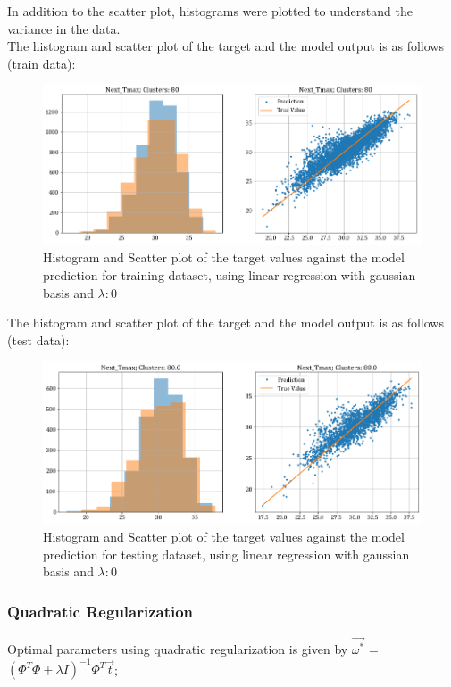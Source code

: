 \documentclass[12pt,a4paper]{article}
\newcommand{\noi}{\noindent}
\begin{document}
\noi
In addition to the scatter plot, histograms were plotted to understand the variance in the data.\\

\noi
The histogram and scatter plot of the target and the model output is as follows (train data):
\begin{figure}[H]
     \centering
     \includegraphics[scale=0.49]{images/t3_d3/no_reg/T_max_nclu_80.png}
     \caption{Histogram and Scatter plot of the target values against the model prediction for training dataset, using linear regression with gaussian basis and $\lambda: 0$}
\end{figure}

\noi
The histogram and scatter plot of the target and the model output is as follows (test data):
\begin{figure}[H]
    \centering
    \includegraphics[scale=0.49]{images/t3_d3/no_reg/T_max_test.png}
    \caption{Histogram and Scatter plot of the target values against the model prediction for testing dataset, using linear regression with gaussian basis and $\lambda: 0$}
\end{figure}


\subsubsection{Quadratic Regularization}
Optimal parameters using quadratic regularization is given by $\vec{\omega^*}$ = $(\Phi^T\Phi + \lambda I)^{-1} \Phi^T \vec{t}$;\\
\end{document}
